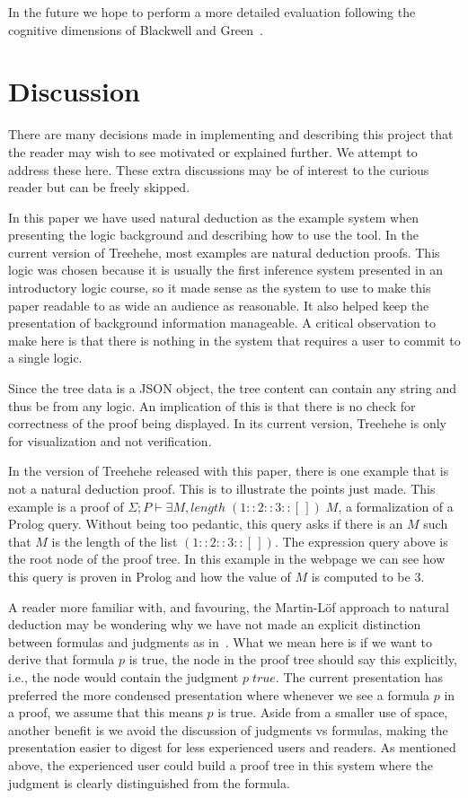 \documentclass[journal]{vgtc}                %
\newcommand{\projectname}{Treehehe}
\begin{document}
In the future we hope to perform a more detailed evaluation following the cognitive dimensions of Blackwell and Green~\cite{cogdim-blackwell+green}.

\section{Discussion}
\label{sec:discussion}

There are many decisions made in implementing and describing this project that the reader may wish to see motivated or explained further. We attempt to address these here. These extra discussions may be of interest to the curious reader but can be freely skipped.

In this paper we have used natural deduction as the example system when presenting the logic background and describing how to use the tool. In the current version of \projectname{}, most examples are natural deduction proofs. This logic was chosen because it is usually the first inference system presented in an introductory logic course, so it made sense as the system to use to make this paper readable to as wide an audience as reasonable. It also helped keep the presentation of background information manageable. A critical observation to make here is that there is nothing in the system that requires a user to commit to a single logic.

Since the tree data is a JSON object, the tree content can contain any string and thus be from any logic. An implication of this is that there is no check for correctness of the proof being displayed. In its current version, \projectname{} is only for visualization and not verification.

In the version of \projectname{} released with this paper, there is one example that is not a natural deduction proof. This is to illustrate the points just made. This example is a proof of $\Sigma ; P \vdash \exists M, \mathit{length} \; (1 :: 2 :: 3 :: [ \, ]) \; M$, a formalization of a Prolog query. Without being too pedantic, this query asks if there is an $M$ such that $M$ is the length of the list $(1 :: 2 :: 3 :: [\, ])$. The expression query above is the root node of the proof tree. In this example in the webpage we can see how this query is proven in Prolog and how the value of $M$ is computed to be 3.

A reader more familiar with, and favouring, the Martin-L{\"o}f approach to natural deduction may be wondering why we have not made an explicit distinction between formulas and judgments as in~\cite{natded-pfenning}. What we mean here is if we want to derive that formula $p$ is true, the node in the proof tree should say this explicitly, i.e., the node would contain the judgment $p \; \mathit{true}$. The current presentation has preferred the more condensed presentation where whenever we see a formula $p$ in a proof, we assume that this means $p$ is true. Aside from a smaller use of space, another benefit is we avoid the discussion of judgments vs formulas, making the presentation easier to digest for less experienced users and readers. As mentioned above, the experienced user could build a proof tree in this system where the judgment is clearly distinguished from the formula.
\end{document}
